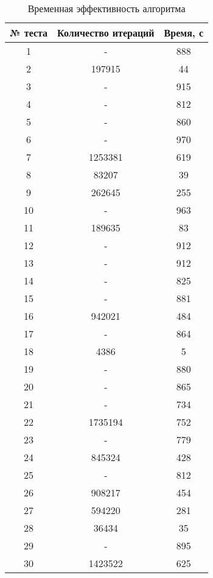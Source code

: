 \begin{table}[ht!]
	\centering
	\begin{tabular}{|c|c|c|}
		\hline
		№ теста & Количество итераций & Время, с \\ \hline
		1       & -                   & 888      \\ \hline
		2       & 197915              & 44       \\ \hline
		3       & -                   & 915      \\ \hline
		4       & -                   & 812      \\ \hline
		5       & -                   & 860      \\ \hline
		6       & -                   & 970      \\ \hline
		7       & 1253381             & 619      \\ \hline
		8       & 83207               & 39       \\ \hline
		9       & 262645              & 255      \\ \hline
		10      & -                   & 963      \\ \hline
		11      & 189635              & 83       \\ \hline
		12      & -                   & 912      \\ \hline
		13      & -                   & 912      \\ \hline
		14      & -                   & 825      \\ \hline
		15      & -                   & 881      \\ \hline
		16      & 942021              & 484      \\ \hline
		17      & -                   & 864      \\ \hline
		18      & 4386                & 5        \\ \hline
		19      & -                   & 880      \\ \hline
		20      & -                   & 865      \\ \hline
		21      & -                   & 734      \\ \hline
		22      & 1735194             & 752      \\ \hline
		23      & -                   & 779      \\ \hline
		24      & 845324              & 428      \\ \hline
		25      & -                   & 812      \\ \hline
		26      & 908217              & 454      \\ \hline
		27      & 594220              & 281      \\ \hline
		28      & 36434               & 35       \\ \hline
		29      & -                   & 895      \\ \hline
		30      & 1423522             & 625      \\ \hline
	\end{tabular}
	\caption{Временная эффективность алгоритма}
	\label{BigResults1}
\end{table}
